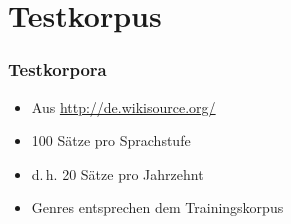 \documentclass[t]{beamer} %
\begin{document}
\section*{Testkorpus}

\begin{frame}
  \frametitle{Testkorpora}
  \begin{itemize}
  \item Aus \url{http://de.wikisource.org/}\pause
  \vspace*{1ex}
  \item 100 Sätze pro Sprachstufe\pause
  \item d.\,h. 20 Sätze pro Jahrzehnt\pause
  \vspace*{1ex}
  \item Genres entsprechen dem Trainingskorpus
  \end{itemize}  
\end{frame}
\end{document}
